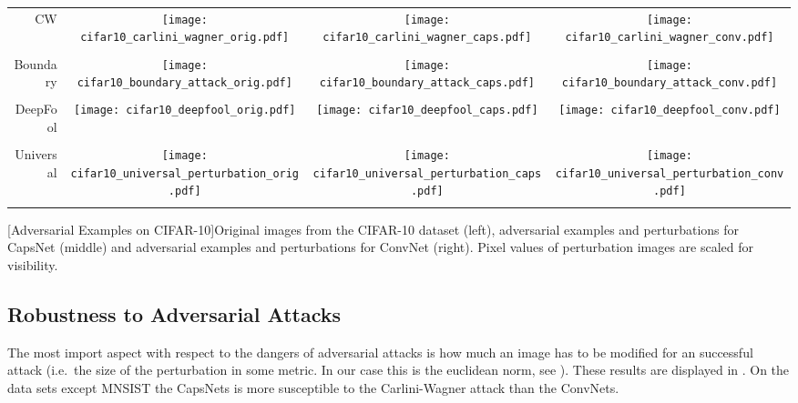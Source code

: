 \begin{center}
\begin{longtable*}{rccc}
	
	CW & \texttt{[image: cifar10\_carlini\_wagner\_orig.pdf]} & \texttt{[image: cifar10\_carlini\_wagner\_caps.pdf]} & \texttt{[image: cifar10\_carlini\_wagner\_conv.pdf]}\\
	\\
	Boundary & \texttt{[image: cifar10\_boundary\_attack\_orig.pdf]} & \texttt{[image: cifar10\_boundary\_attack\_caps.pdf]} & \texttt{[image: cifar10\_boundary\_attack\_conv.pdf]}\\
	\\
	DeepFool & \texttt{[image: cifar10\_deepfool\_orig.pdf]} & \texttt{[image: cifar10\_deepfool\_caps.pdf]} & \texttt{[image: cifar10\_deepfool\_conv.pdf]}\\
	\\
	Universal & \texttt{[image: cifar10\_universal\_perturbation\_orig.pdf]} & \texttt{[image: cifar10\_universal\_perturbation\_caps.pdf]} & \texttt{[image: cifar10\_universal\_perturbation\_conv.pdf]}\\
	\\
\end{longtable*}
[Adversarial Examples on CIFAR-10]{Original images from the CIFAR-10 dataset (left), adversarial examples and perturbations for CapsNet (middle) and adversarial examples and perturbations for ConvNet (right). Pixel values of perturbation images are scaled for visibility.}
\label{tab:images}
\end{center}

\subsection{Robustness to Adversarial Attacks}

The most import aspect with respect to the dangers of adversarial attacks is how much an image has to be modified for an successful attack
(i.e.\ the size of the perturbation in some metric. In our case this is the euclidean norm, see  ).
These results are displayed in .
On the data sets except MNSIST the CapsNets is more susceptible to the Carlini-Wagner attack than the ConvNets.

